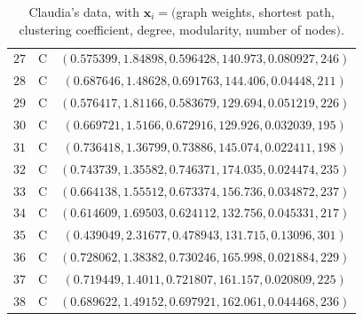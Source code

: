 \documentclass[\ifafour a4paper,12pt,\else a5paper,10pt,\fi%
onecolumn,oneside,article,%
british%
]{memoir}
\theoremstyle{remark}
\theoremstyle{innote}
\renewcommand*{\|}{\mathpunct{|}}
\newcommand*{\yH}{h}
\newcommand*{\yx}{x}
\newcommand*{\yxx}{\bm{\yx}}
\theoremstyle{plain}
\begin{document}
\begin{table}[!h]
\begin{tabular}[t]{@{}c@{\quad}c@{\quad}c@{}}
$27$ & C & $(0.575399, 1.84898, 0.596428, 140.973, 0.080927, 246)$ \\
$28$ & C & $(0.687646, 1.48628, 0.691763, 144.406, 0.04448, 211)$ \\
$29$ & C & $(0.576417, 1.81166, 0.583679, 129.694, 0.051219, 226)$ \\
$30$ & C & $(0.669721, 1.5166, 0.672916, 129.926, 0.032039, 195)$ \\
$31$ & C & $(0.736418, 1.36799, 0.73886, 145.074, 0.022411, 198)$ \\
$32$ & C & $(0.743739, 1.35582, 0.746371, 174.035, 0.024474, 235)$ \\
$33$ & C & $(0.664138, 1.55512, 0.673374, 156.736, 0.034872, 237)$ \\
$34$ & C & $(0.614609, 1.69503, 0.624112, 132.756, 0.045331, 217)$ \\
$35$ & C & $(0.439049, 2.31677, 0.478943, 131.715, 0.13096, 301)$ \\
$36$ & C & $(0.728062, 1.38382, 0.730246, 165.998, 0.021884, 229)$ \\
$37$ & C & $(0.719449, 1.4011, 0.721807, 161.157, 0.020809, 225)$ \\
$38$ & C & $(0.689622, 1.49152, 0.697921, 162.061, 0.044468, 236)$ 
    \end{tabular}
    \caption{Claudia's data, with
      $\yxx_i=($graph weights, shortest path, clustering
        coefficient, degree, modularity, number of
        nodes$)$.}
  \label{tab:simones_data}
\end{table}
\end{document}
